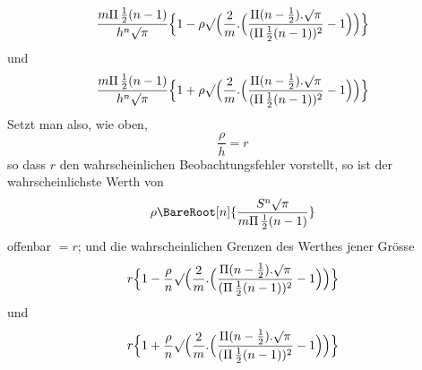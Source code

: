 \[
\frac{m\Pi\,\frac12(n-1)}{h^n\surd\pi}\Bigl\{1-\rho\surd\Bigl(\frac2m.\Bigl(\frac{\Pi(n-\frac12).\surd\pi}{(\Pi\,\frac12(n-1))^2}-1\Bigr)\Bigr)\Bigr\}
\]
und
\[
\frac{m\Pi\,\frac12(n-1)}{h^n\surd\pi}\Bigl\{1+\rho\surd\Bigl(\frac2m.\Bigl(\frac{\Pi(n-\frac12).\surd\pi}{(\Pi\,\frac12(n-1))^2}-1\Bigr)\Bigr)\Bigr\}
\]
Setzt man also, wie oben,
\[
\frac\rho h=r
\]
so dass \(r\) den wahrscheinlichen Beobachtungsfehler vorstellt, so ist der wahrscheinlichste Werth von
\[
\rho\BareRoot[n]{\frac{S^{\mathrm n}\surd\pi}{m\Pi\,\frac12(n-1)}}
\]
offenbar \(=r\); und die wahrscheinlichen Grenzen des Werthes jener Grösse
\[
r\Bigl\{1-\frac\rho n\surd\Bigl(\frac2m.\Bigl(\frac{\Pi(n-\frac12).\surd\pi}{(\Pi\,\frac12(n-1))^2}-1\Bigr)\Bigr)\Bigr\}
\]
und
\[
r\Bigl\{1+\frac\rho n\surd\Bigl(\frac2m.\Bigl(\frac{\Pi(n-\frac12).\surd\pi}{(\Pi\,\frac12(n-1))^2}-1\Bigr)\Bigr)\Bigr\}
\]

